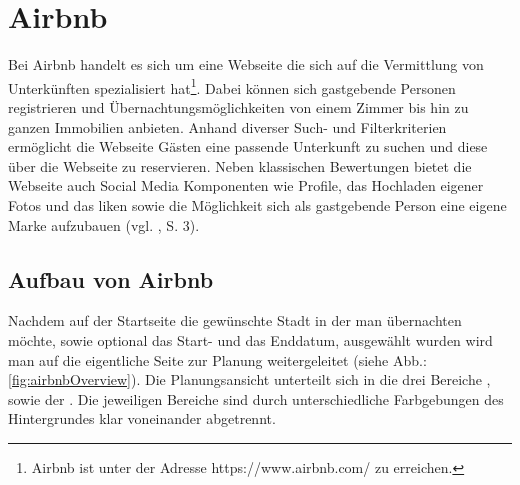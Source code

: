 \documentclass[../Bachelorarbeit.tex]{subfiles}
\begin{document}
\section{Airbnb}
\label{Airbnb}
Bei Airbnb handelt es sich um eine Webseite die sich auf die Vermittlung von Unterkünften spezialisiert hat\footnote{
	Airbnb ist unter der Adresse https://www.airbnb.com/ zu erreichen.
	}. 
Dabei können sich gastgebende Personen registrieren und Übernachtungsmöglichkeiten von einem Zimmer bis hin zu ganzen Immobilien anbieten. 
Anhand diverser Such- und Filterkriterien ermöglicht die Webseite Gästen eine passende Unterkunft zu suchen und diese über die Webseite zu reservieren.
Neben klassischen Bewertungen bietet die Webseite auch Social Media Komponenten wie Profile, das Hochladen eigener Fotos und das liken  sowie die Möglichkeit sich als gastgebende Person eine eigene Marke aufzubauen (vgl. \cite{Yannopoulou2013}, S. 3).

\subsection{Aufbau von Airbnb}
Nachdem auf der Startseite die gewünschte Stadt in der man übernachten möchte, sowie optional das Start- und das Enddatum, ausgewählt wurden wird man auf die eigentliche Seite zur Planung weitergeleitet (siehe Abb.: \ref{fig:airbnbOverview}).
Die Planungsansicht unterteilt sich in die drei Bereiche ,  sowie der .
Die jeweiligen Bereiche sind durch unterschiedliche Farbgebungen des Hintergrundes klar voneinander abgetrennt.
\end{document}

